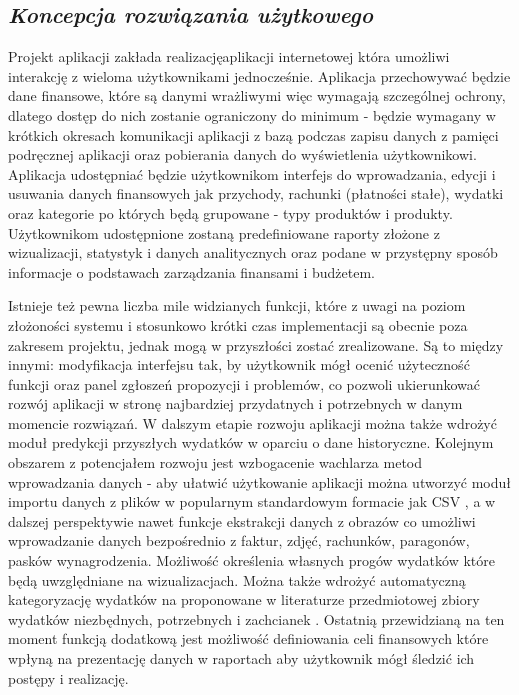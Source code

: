 \documentclass[a4paper, 10pt, twoside, openright]{report}
\newcommand{\customstylesection}[1]{\textbf{\textit{#1}}}
\begin{document}
\begin{large}
\section{\customstylesection{Koncepcja rozwiązania użytkowego}}
{Projekt aplikacji zakłada realizacjęaplikacji internetowej która umożliwi 
interakcję z wieloma użytkownikami jednocześnie. Aplikacja przechowywać będzie 
dane finansowe, które są danymi wrażliwymi więc wymagają szczególnej ochrony, 
dlatego dostęp do nich zostanie ograniczony do minimum - będzie wymagany w 
krótkich okresach komunikacji aplikacji z bazą podczas zapisu danych z pamięci 
podręcznej aplikacji oraz pobierania danych do wyświetlenia użytkownikowi. 
Aplikacja udostępniać będzie użytkownikom interfejs do wprowadzania, edycji i 
usuwania danych finansowych jak przychody, rachunki (płatności stałe), wydatki 
oraz kategorie po których będą grupowane - typy produktów i produkty. 
Użytkownikom udostępnione zostaną predefiniowane raporty złożone z wizualizacji,
 statystyk i danych analitycznych oraz podane w przystępny sposób informacje o 
podstawach zarządzania finansami i budżetem.}

\medskip
{Istnieje też pewna liczba mile widzianych funkcji, które z uwagi na poziom 
złożoności systemu i stosunkowo krótki czas implementacji są obecnie poza 
zakresem projektu, jednak mogą w przyszłości zostać zrealizowane. Są to między 
innymi: modyfikacja interfejsu tak, by użytkownik mógł ocenić użyteczność 
funkcji oraz panel zgłoszeń propozycji i problemów, co pozwoli ukierunkować 
rozwój aplikacji w stronę najbardziej przydatnych i potrzebnych w danym momencie
 rozwiązań. W dalszym etapie rozwoju aplikacji można także wdrożyć moduł 
predykcji przyszłych wydatków w oparciu o dane historyczne. Kolejnym obszarem z 
potencjałem rozwoju jest wzbogacenie wachlarza metod wprowadzania danych - aby 
ułatwić użytkowanie aplikacji można utworzyć moduł importu danych z plików w 
popularnym standardowym formacie jak CSV \cite{CSV}, a w dalszej perspektywie 
nawet funkcje ekstrakcji danych z obrazów co umożliwi wprowadzanie danych 
bezpośrednio z faktur, zdjęć, rachunków, paragonów, pasków wynagrodzenia. 
Możliwość określenia własnych progów wydatków które będą uwzględniane na 
wizualizacjach. Można także wdrożyć automatyczną kategoryzację wydatków na 
proponowane w literaturze przedmiotowej zbiory wydatków niezbędnych, potrzebnych
 i zachcianek \cite{budzetdomowypodkontrola}. Ostatnią przewidzianą na ten 
moment funkcją dodatkową jest możliwość definiowania celi finansowych które 
wpłyną na prezentację danych w raportach aby użytkownik mógł śledzić ich postępy
 i realizację.}


\end{large}
\end{document}
